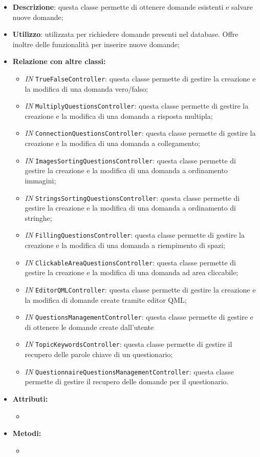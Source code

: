 \begin{itemize}
	\item \textbf{Descrizione}: questa classe permette di ottenere domande esistenti e salvare nuove domande;
	\item \textbf{Utilizzo}: utilizzata per richiedere domande presenti nel database. Offre inoltre delle funzionalità per inserire nuove domande;
	\item \textbf{Relazione con altre classi:}
	\begin{itemize}
		\item \textit{IN} \texttt{TrueFalseController}: questa classe permette di gestire la creazione e la modifica di una domanda vero/falso;
		\item \textit{IN} \texttt{MultiplyQuestionsController}: questa classe permette di gestire la creazione e la modifica di una domanda a risposta multipla; 
		\item \textit{IN} \texttt{ConnectionQuestionsController}: questa classe permette di gestire la creazione e la modifica di una domanda a collegamento;
		\item \textit{IN} \texttt{ImagesSortingQuestionsController}: questa classe permette di gestire la creazione e la modifica di una domanda a ordinamento immagini;
		\item \textit{IN} \texttt{StringsSortingQuestionsController}: questa classe permette di gestire la creazione e la modifica di una domanda a ordinamento di stringhe;
		\item \textit{IN} \texttt{FillingQuestionsController}: questa classe permette di gestire la creazione e la modifica di una domanda a riempimento di spazi; 
		\item \textit{IN} \texttt{ClickableAreaQuestionsController}: questa classe permette di gestire la creazione e la modifica di una domanda ad area cliccabile;
		\item \textit{IN} \texttt{EditorQMLController}: questa classe permette di gestire la creazione e la modifica di domande create tramite editor QML;
		\item \textit{IN} \texttt{QuestionsManagementController}: questa classe permette di gestire e di ottenere le domande create dall'utente
		\item \textit{IN} \texttt{TopicKeywordsController}: questa classe permette di gestire il recupero delle parole chiave di un questionario;
		\item \textit{IN} \texttt{QuestionnaireQuestionsManagementController}: questa classe permette di gestire il recupero delle domande per il questionario.
		
	\end{itemize}
	\item \textbf{Attributi:}
	\begin{itemize}
		\item 
	\end{itemize}
	\item \textbf{Metodi:}
	\begin{itemize}
		\item 
	\end{itemize}
\end{itemize}

